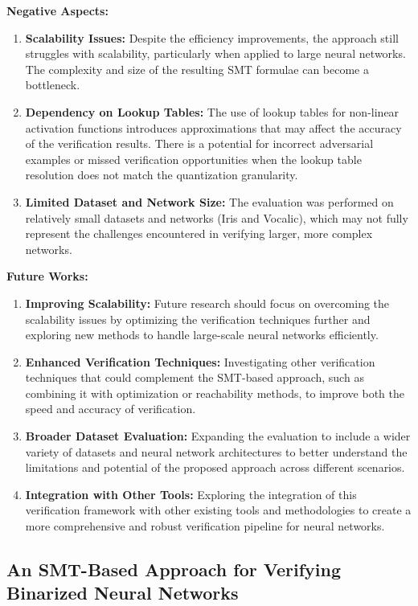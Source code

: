 \documentclass[conference]{IEEEtran}
\begin{document}
\textbf{Negative Aspects:}
\begin{enumerate}
    \item \textbf{Scalability Issues:} Despite the efficiency improvements, the approach still struggles with scalability, particularly when applied to large neural networks. The complexity and size of the resulting SMT formulae can become a bottleneck.
    \item \textbf{Dependency on Lookup Tables:} The use of lookup tables for non-linear activation functions introduces approximations that may affect the accuracy of the verification results. There is a potential for incorrect adversarial examples or missed verification opportunities when the lookup table resolution does not match the quantization granularity.
    \item \textbf{Limited Dataset and Network Size:} The evaluation was performed on relatively small datasets and networks (Iris and Vocalic), which may not fully represent the challenges encountered in verifying larger, more complex networks.
\end{enumerate}

\textbf{Future Works:}
\begin{enumerate}
    \item \textbf{Improving Scalability:} Future research should focus on overcoming the scalability issues by optimizing the verification techniques further and exploring new methods to handle large-scale neural networks efficiently.
    \item \textbf{Enhanced Verification Techniques:} Investigating other verification techniques that could complement the SMT-based approach, such as combining it with optimization or reachability methods, to improve both the speed and accuracy of verification.
    \item \textbf{Broader Dataset Evaluation:} Expanding the evaluation to include a wider variety of datasets and neural network architectures to better understand the limitations and potential of the proposed approach across different scenarios.
    \item \textbf{Integration with Other Tools:} Exploring the integration of this verification framework with other existing tools and methodologies to create a more comprehensive and robust verification pipeline for neural networks.
\end{enumerate}

\subsection{An SMT-Based Approach for Verifying
Binarized Neural Networks\cite{c8}}
\end{document}

